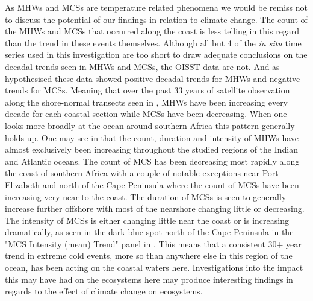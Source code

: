 \documentclass[a4paper,10pt,review]{elsarticle}
\begin{document}
As MHWs and MCSs are temperature related phenomena we would be remiss not to discuss the potential of our findings in relation to climate change. The count of the MHWs and MCSs that occurred along the coast is less telling in this regard than the trend in these events themselves. Although all but 4 of the \emph{in situ} time series used in this investigation are too short to draw adequate conclusions on the decadal trends seen in MHWs and MCSs, the OISST data are not. And as hypothesised these data showed positive decadal trends for MHWs and negative trends for MCSs. Meaning that over the past 33 years of satellite observation along the shore-normal transects seen in , MHWs have been increasing every decade for each coastal section while MCSs have been decreasing. When one looks more broadly at the ocean around southern Africa this pattern generally holds up. One may see in  that the count, duration and intensity of MHWs have almost exclusively been increasing throughout the studied regions of the Indian and Atlantic oceans. The count of MCS has been decreasing most rapidly along the coast of southern Africa with a couple of notable exceptions near Port Elizabeth and north of the Cape Peninsula where the count of MCSs have been increasing very near to the coast. The duration of MCSs is seen to generally increase further offshore with most of the nearshore changing little or decreasing. The intensity of MCSs is either changing little near the coast or is increasing dramatically, as seen in the dark blue spot north of the Cape Peninsula in the "MCS Intensity (mean) Trend" panel in . This means that a consistent 30+ year trend in extreme cold events, more so than anywhere else in this region of the ocean, has been acting on the coastal waters here. Investigations into the impact this may have had on the ecosystems here may produce interesting findings in regards to the effect of climate change on ecosystems.
\end{document}
